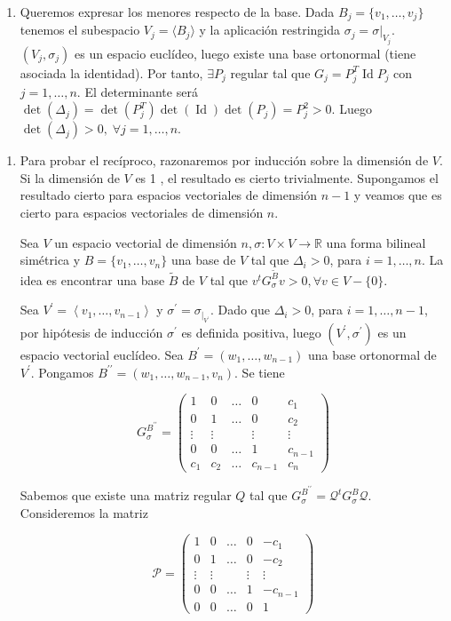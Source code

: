 \documentclass[12pt, a4paper, ones, notitlepage, openany,titlepage]{article}
\newcommand{\dobleimplicacion}[2]{
	\begin{enumerate}[label=$\Rightarrow/$]
		\item #1
	\end{enumerate}
	\begin{enumerate}[label=$\Leftarrow/$]
		\item #2
	\end{enumerate}
}
\begin{document}
\dobleimplicacion{
Queremos expresar los menores respecto de la base. Dada $B_j = \{v_1, \ldots, v_j\}$ tenemos el subespacio $V_j = \langle B_j \rangle$ y la aplicación restringida $\sigma_j = \sigma|_{V_j}$. $(V_j, \sigma_j)$ es un espacio euclídeo, luego existe una base ortonormal (tiene asociada la identidad). Por tanto, $\exists P_j$ regular tal que $G_j = P_j^T \operatorname{Id} P_j$ con $j = 1,\ldots,n$. El determinante será $\det(\Delta_j) = \det(P_j^T) \det(\operatorname{Id}) \det(P_j) = P_j^2 > 0$. Luego $\det(\Delta_j) > 0, \; \forall j = 1,\ldots,n$.
}{
Para probar el recíproco, razonaremos por inducción sobre la dimensión de $V$. Si la dimensión de $V$ es 1 , el resultado es cierto trivialmente. Supongamos el resultado cierto para espacios vectoriales de dimensión $n-1$ y veamos que es cierto para espacios vectoriales de dimensión $n$.

Sea $V$ un espacio vectorial de dimensión $n, \sigma: V \times V \rightarrow \mathbb{R}$ una forma bilineal simétrica y $B=\{v_{1}, \ldots, v_{n}\}$ una base de $V$ tal que $\Delta_{i}>0$, para $i=1, \ldots, n$. La idea es encontrar una base $\widetilde{B}$ de $V$ tal que $v^t G_\sigma^{\widetilde{B}} v > 0, \forall v \in V - \{0\}$.

Sea $V^{\prime}=\left\langle v_{1}, \ldots, v_{n-1}\right\rangle$ y $\sigma^{\prime}=\sigma_{\left.\right|_{V^{\prime}}}$. Dado que $\Delta_{i}>0$, para $i=1, \ldots, n-1$, por hipótesis de inducción $\sigma^{\prime}$ es definida positiva, luego $\left(V^{\prime}, \sigma^{\prime}\right)$ es un espacio vectorial euclídeo. Sea $B^{\prime}=\left(w_{1}, \ldots, w_{n-1}\right)$ una base ortonormal de $V^{\prime}$. Pongamos $B^{\prime \prime}=\left(w_{1}, \ldots, w_{n-1}, v_{n}\right)$. Se tiene

$$
G_{\sigma}^{B^{\prime \prime}}=\left(\begin{array}{ccccc}
	1 & 0 & \ldots & 0 & c_{1} \\
	0 & 1 & \ldots & 0 & c_{2} \\
	\vdots & \vdots & & \vdots & \vdots \\
	0 & 0 & \ldots & 1 & c_{n-1} \\
	c_{1} & c_{2} & \ldots & c_{n-1} & c_{n}
\end{array}\right)
$$

Sabemos que existe una matriz regular $Q$ tal que $G_{\sigma}^{B^{\prime \prime}}=\mathcal{Q}^{t} G_{\sigma}^{B} \mathcal{Q}$. Consideremos la matriz

$$
\mathcal{P}=\left(\begin{array}{ccccc}
	1 & 0 & \ldots & 0 & -c_{1} \\
	0 & 1 & \ldots & 0 & -c_{2} \\
	\vdots & \vdots & & \vdots & \vdots \\
	0 & 0 & \ldots & 1 & -c_{n-1} \\
	0 & 0 & \ldots & 0 & 1
\end{array}\right)
$$

}
\end{document}
